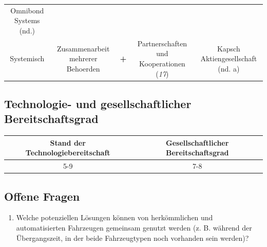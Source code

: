 \documentclass[
]{book}
\providecommand{\tightlist}{%
  \setlength{\itemsep}{0pt}\setlength{\parskip}{0pt}}
\begin{document}
\begin{longtable}[]{@{}ccccc@{}}
\begin{minipage}[t]{0.17\columnwidth}
Omnibond Systems (nd.)\strut
\end{minipage}\tabularnewline
\begin{minipage}[t]{0.17\columnwidth}\centering
Systemisch\strut
\end{minipage} & \begin{minipage}[t]{0.16\columnwidth}\centering
Zusammenarbeit mehrerer Behoerden\strut
\end{minipage} & \begin{minipage}[t]{0.17\columnwidth}\centering
\textbf{+}\strut
\end{minipage} & \begin{minipage}[t]{0.17\columnwidth}\centering
Partnerschaften und Kooperationen (\emph{17})\strut
\end{minipage} & \begin{minipage}[t]{0.17\columnwidth}\centering
Kapsch Aktiengesellschaft (nd. a)\strut
\end{minipage}\tabularnewline
\bottomrule
\end{longtable}

\hypertarget{technologie--und-gesellschaftlicher-bereitschaftsgrad-9}{%
\subsection*{Technologie- und gesellschaftlicher Bereitschaftsgrad}\label{technologie--und-gesellschaftlicher-bereitschaftsgrad-9}}

\begin{longtable}[]{@{}cc@{}}
\toprule
Stand der Technologiebereitschaft & Gesellschaftlicher Bereitschaftsgrad\tabularnewline
\midrule
\endhead
5-9 & 7-8\tabularnewline
\bottomrule
\end{longtable}

\hypertarget{offene-fragen-11}{%
\subsection*{Offene Fragen}\label{offene-fragen-11}}

\begin{enumerate}
\def\labelenumi{\arabic{enumi}.}
\tightlist
\item
  Welche potenziellen Lösungen können von herkömmlichen und automatisierten Fahrzeugen gemeinsam genutzt werden (z. B. während der Übergangszeit, in der beide Fahrzeugtypen noch vorhanden sein werden)?
\end{enumerate}
\end{document}
